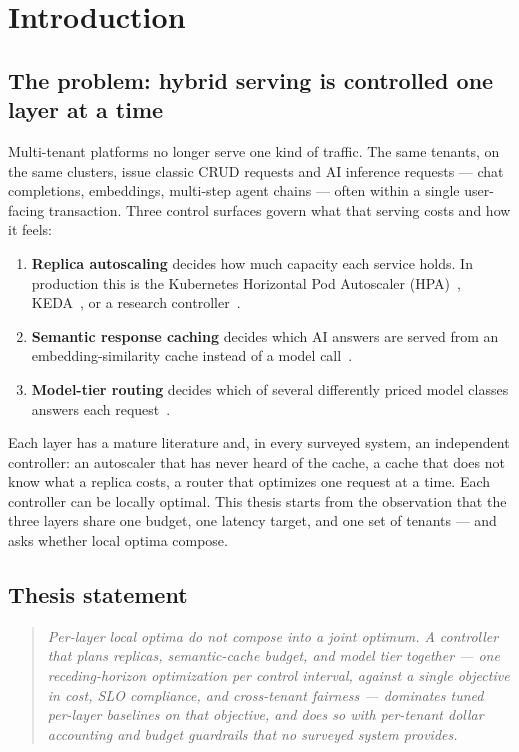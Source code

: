 \chapter{Introduction}
\label{ch:introduction}

\section{The problem: hybrid serving is controlled one layer at a time}

Multi-tenant platforms no longer serve one kind of traffic. The same tenants,
on the same clusters, issue classic CRUD requests and AI inference requests
--- chat completions, embeddings, multi-step agent chains --- often within a
single user-facing transaction. Three control surfaces govern what that
serving costs and how it feels:

\begin{enumerate}
  \item \textbf{Replica autoscaling} decides how much capacity each service
        holds. In production this is the Kubernetes Horizontal Pod Autoscaler
        (HPA)~\citep{k8shpa}, KEDA~\citep{keda}, or a research
        controller~\citep{firm2020,sageserve2025,chiron2025,aladdin2024}.
  \item \textbf{Semantic response caching} decides which AI answers are
        served from an embedding-similarity cache instead of a model
        call~\citep{gptcache2023,scalm2024,instcache2024,meancache2024}.
  \item \textbf{Model-tier routing} decides which of several differently
        priced model classes answers each request~\citep{infaas2019}.
\end{enumerate}

Each layer has a mature literature and, in every surveyed system, an
independent controller: an autoscaler that has never heard of the cache, a
cache that does not know what a replica costs, a router that optimizes one
request at a time. Each controller can be locally optimal. This thesis starts
from the observation that the three layers share one budget, one latency
target, and one set of tenants --- and asks whether local optima compose.

\section{Thesis statement}

\begin{quote}
\emph{Per-layer local optima do not compose into a joint optimum. A
controller that plans replicas, semantic-cache budget, and model tier
together --- one receding-horizon optimization per control interval, against
a single objective in cost, SLO compliance, and cross-tenant fairness ---
dominates tuned per-layer baselines on that objective, and does so with
per-tenant dollar accounting and budget guardrails that no surveyed system
provides.}
\end{quote}


